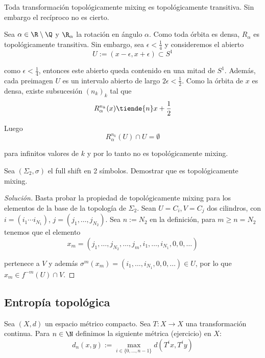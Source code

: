 \documentclass[	docname= Sistemas\ Din\'amicos,
				finished=1,
				semester=1,
				year=2017,
				professor=Godofredo\ Iommi,
				sigla=MAT2565]{apunte}
\begin{document}
\begin{obsd} Toda transformación topológicamente mixing es topológicamente transitiva. Sin embargo el recíproco no es cierto.
\end{obsd}

\begin{ex} Sea $\alpha \in \R \setminus \Q$ y $\R_{\alpha}$ la rotación en ángulo $\alpha$. Como toda órbita es densa, $R_{\alpha}$ es topológicamente transitiva. Sin embargo, sea $\epsilon < \frac{1}{4}$ y consideremos el abierto
	$$U := (x-\epsilon, x+\epsilon) \subset S^{1}$$

como $\epsilon < \frac{1}{4}$, entonces este abierto queda contenido en una mitad de $S^{1}$. Además, cada preimagen $U$ es un intervalo abierto de largo $2\epsilon < \frac{1}{2}$. Como la órbita de $x$ es densa, existe subsucesión $(n_{k})_{k}$ tal que
	$$R_{\alpha}^{n_{k}}(x) \tiende{n} x + \frac{1}{2}$$

Luego
	$$R_{\alpha}^{n_{k}}(U) \cap U = \emptyset$$
	
para infinitos valores de $k$ y por lo tanto no es topológicamente mixing.
\end{ex}

\begin{ej} Sea $(\Sigma_{2}, \sigma)$ el full shift en 2 símbolos. Demostrar que es topológicamente mixing.
\end{ej}

\begin{proof}[Solución] Basta probar la propiedad de topológicamente mixing para los elementos de la base de la topología de $\Sigma_{2}$. Sean $U = C_{i}, V= C_{j}$ dos cilindros, con $i = (i_{1} \cdots i_{N_{1}})$, $j = (j_{1}, \ldots, j_{N_{2}})$. Sea $n := N_{2}$ en la definición, para $m \geq n = N_{2}$ tenemos que el elemento 
	$$x_{m} = (j_{1}, \ldots, j_{N_{2}}, \ldots, j_{m}, i_{1}, \ldots, i_{N_{1}}, 0, 0, \ldots) $$

pertenece a $V$ y además $\sigma^{m}(x_{m}) = (i_{1}, \ldots, i_{N_{1}}, 0 , 0, \ldots) \in U$, por lo que $x_{m} \in f^{-m}(U) \cap V$.
\end{proof}


\subsection{Entropía topológica}

Sea $(X,d)$ un espacio métrico compacto. Sea $T: X \to X$ una transformación continua. Para $n \in \N$ definimos la siguiente métrica (ejercicio) en $X$:
	$$d_{n}(x,y) := \max_{i \in \{0,\ldots,n-1\}} d(T^{i}x, T^{i}y) $$
\end{document}
